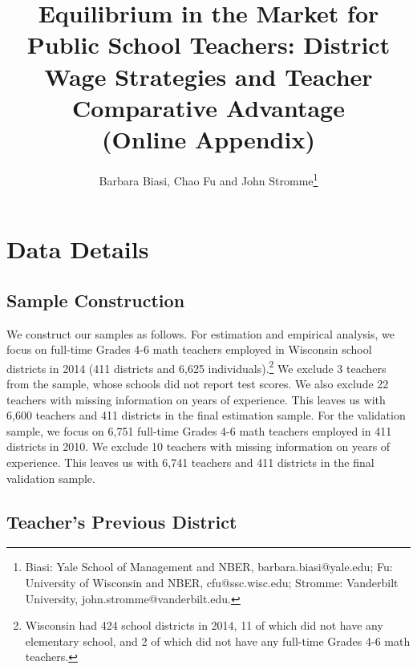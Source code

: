 \documentclass[notitlepage,12pt]{article}%
\begin{document}
\title{Equilibrium in the Market for Public School Teachers: District Wage Strategies
and Teacher Comparative Advantage\\(Online Appendix)}
\author{Barbara Biasi, Chao Fu and John Stromme\thanks{Biasi: Yale School of
Management and NBER, barbara.biasi@yale.edu; Fu: University of Wisconsin and NBER, cfu@ssc.wisc.edu;
Stromme: Vanderbilt University, john.stromme@vanderbilt.edu. } }
\maketitle

\setcounter{table}{0} \setcounter{figure}{0}
\renewcommand{\thesection}{B\arabic{section}}
\renewcommand{\thetable}{B\MakeUppercase{\arabic{table}}} \renewcommand{\thefigure}{B\MakeUppercase{\arabic{figure}}}



\section{Data Details}

\subsection{Sample Construction}

We construct our samples as follows. For estimation and empirical analysis, we
focus on full-time Grades 4-6 math teachers employed in Wisconsin school
districts in 2014 (411 districts and 6,625 individuals).\footnote{Wisconsin
had 424 school districts in 2014, 11 of which did not have any elementary
school, and 2 of which did not have any full-time Grades 4-6 math teachers.}
We exclude 3 teachers from the sample, whose schools did not report test
scores. We also exclude 22 teachers with missing information on years of
experience. This leaves us with 6,600 teachers and 411 districts in the final
estimation sample. \newline For the validation sample, we focus on 6,751
full-time Grades 4-6 math teachers employed in 411 districts in 2010. We
exclude 10 teachers with missing information on years of experience. This
leaves us with 6,741 teachers and 411 districts in the final validation sample.

\subsection{Teacher's Previous District}
\end{document}
